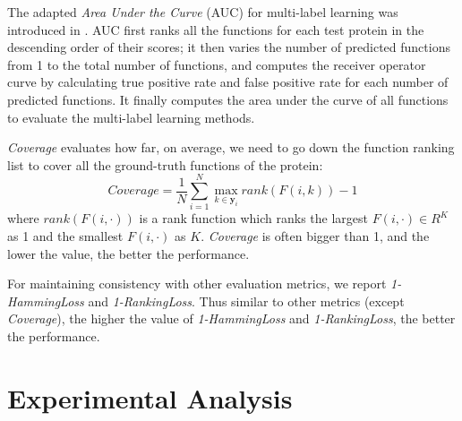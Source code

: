 \documentclass{llncs} %
\begin{document}
The adapted \emph{Area Under the Curve} (AUC) for multi-label learning was introduced
in \cite{bucak2011multi}. AUC first ranks all the functions for each test protein in the descending order of their scores; it then varies the number of predicted functions from 1 to the total number of functions, and computes the receiver operator curve by calculating true positive rate and false positive rate for each number of predicted functions. It finally computes the area under the curve of all functions to evaluate the multi-label learning methods.

\begin{comment}
\emph{One Error} evaluates how many times the top-ranked function is not in the set of ground-truth functions of the proteins:
\begin{displaymath}
OneError=\frac{1}{N}\sum_{i=1}^{N} I(\arg\max_{1\leq k \leq K}F(i,k) \notin \mathbf{y}_i)
\end{displaymath}

\emph{Average Precision} evaluates the average fraction of labels ranked above a particular label $c\in \mathbf{y}_i$ which is actually in $\mathbf{y}_i$
\begin{displaymath}
AveragePrecision=\frac{1}{N}\sum_{i=1}^{N}
\frac{1}{|\mathbf{y}_i|}
\sum_{k_1 \in \mathbf{y}_i}
\frac{|\{k_2 \in \mathbf{y}_i|rank(F(i,k_2))\leq rank(F(i,k_1))\}|}{rank(F(i,k_1))}
\end{displaymath}
where $rank(F(i,\cdot))$ is a rank function which ranks the largest $F(i,\cdot) \in R^K$ as 1 and the smallest $F(i,\cdot)$ as $K$.
\end{comment}
\emph{Coverage} evaluates how far, on average, we need to go down the function ranking list to cover all the ground-truth functions of the protein:
\begin{displaymath}
Coverage=\frac{1}{N}\sum_{i=1}^{N} \max_{k \in \mathbf{y}_i}rank(F(i,k))-1
\end{displaymath}
where $rank(F(i,\cdot))$ is a rank function which ranks the largest $F(i,\cdot) \in R^K$ as 1 and the smallest $F(i,\cdot)$ as $K$.  \emph{Coverage} is often bigger than 1, and the lower the value, the better the performance.

For maintaining consistency with other evaluation metrics, we report  \emph{1-HammingLoss} and \emph{1-RankingLoss}. Thus similar to other metrics (except \emph{Coverage}), the higher the value of \emph{1-HammingLoss} and \emph{1-RankingLoss}, the better the performance.
\section{Experimental Analysis}
\label{expanalysis}
\end{document}
